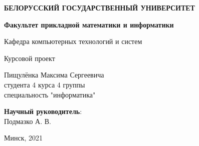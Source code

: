 \begin{titlepage}
    \begin{center}
    \end{center}
    \begin{center}
         \textbf{БЕЛОРУССКИЙ ГОСУДАРСТВЕННЫЙ УНИВЕРСИТЕТ}
    \end{center}
    \begin{center}
         \textbf{Факультет прикладной математики и информатики}
    \end{center}
    \begin{center}
        Кафедра компьютерных технологий и систем
    \end{center}
    
    \vspace{9em}
    
    \begin{center}
        \textbf{\@jobtitle}
    \end{center}
    
    \vspace{2em}
    
    \begin{center}
        Курсовой проект
    \end{center}
    
    \vspace{4em}
    
    \begin{flushright}
        Пищулёнка Максима Сергеевича\\
        студента 4 курса 4 группы\\
        специальность "информатика"\\
    \end{flushright}
    
    \vspace{1em}
    
    \begin{flushright}
         \textbf{Научный руководитель}:\\
         Подмазко А. В.\\
    \end{flushright}
    
    \vfill
    
    \begin{center}
        Минск, 2021
    \end{center}
\end{titlepage}
\newpage
